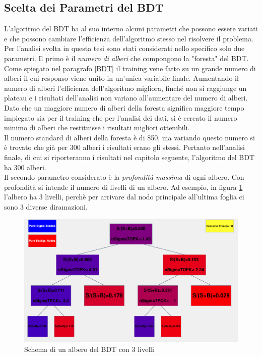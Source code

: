 \subsection{Scelta dei Parametri del BDT}
L'algoritmo del BDT ha al suo interno alcuni parametri che possono essere variati e che possono cambiare l'efficienza dell'algoritmo stesso nel risolvere il problema. Per l'analisi svolta in questa tesi sono stati considerati nello specifico solo due parametri. Il primo è il \textit{numero di alberi} che compongono la "foresta" del BDT. Come spiegato nel paragrafo \ref{BDT}  il training vene fatto su un grande numero di alberi il cui responso viene unito in un'unica variabile finale. Aumentando il numero di alberi l'efficienza dell'algoritmo migliora, finché non si raggiunge un plateau e i risultati dell'analisi non variano all'aumentare del numero di alberi. Dato che un maggiore numero di alberi della foresta significa maggiore tempo impiegato sia per il training che per l'analisi dei dati, si è cercato il numero minimo di alberi che restituisse i risultati migliori ottenibili.
\\Il numero standard di alberi della foresta è di 850, ma variando questo numero si è trovato che già per 300 alberi i risultati erano gli stessi. Pertanto nell'analisi finale, di cui si riporteranno i risultati nel capitolo seguente, l'algoritmo del BDT ha 300 alberi. 
\\Il secondo parametro considerato è la \textit{profondità massima} di ogni albero. Con profondità si intende il numero di livelli di un albero. Ad esempio, in figura \ref{fig:depthBDT} l'albero ha 3 livelli, perchè per arrivare dal nodo principale all'ultima foglia ci sono 3 diverse diramazioni.
\\
    \begin{figure}[htbp] 
        \centering
        \includegraphics[width=0.7\linewidth]{training&testing/depthBDT.png}
        \caption{Schema di un albero del BDT con 3 livelli}
        \label{fig:depthBDT}
    \end{figure}
    
